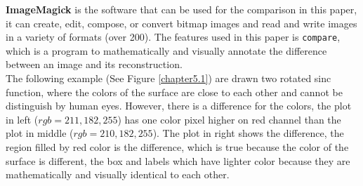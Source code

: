 \documentclass{report}
\begin{document}
\textbf{ImageMagick} \citep{ImageMagick} is the software that can be used for the comparison in this paper, it can create, edit, compose, or convert bitmap images and read and write images in a variety of formats (over 200). The features used in this paper is \texttt{compare}, which is a program to mathematically and visually annotate the difference between an image and its reconstruction.\\

The following example (See Figure \ref{chapter5.1}) are drawn two rotated sinc function, where the colors of the surface are close to each other and cannot be distinguish by human eyes. However, there is a difference for the colors, the plot in left ($rgb = 211, 182, 255$) has one color pixel higher on red channel than the plot in middle ($rgb = 210, 182, 255$). The plot in right shows the difference, the region filled by red color is the difference, which is true because the color of the surface is different, the box and labels which have lighter color because they are mathematically and visually identical to each other. \\
\end{document}
